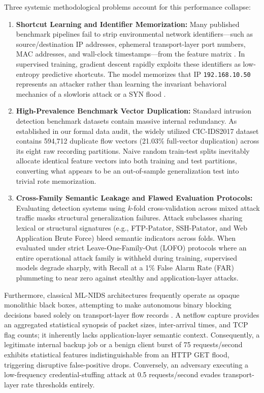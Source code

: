\documentclass[conference]{IEEEtran}
\begin{document}
Three systemic methodological problems account for this performance collapse:
\begin{enumerate}
    \item \textbf{Shortcut Learning and Identifier Memorization:} Many published benchmark pipelines fail to strip environmental network identifiers---such as source/destination IP addresses, ephemeral transport-layer port numbers, MAC addresses, and wall-clock timestamps---from the feature matrix \cite{arp2022dos}. In supervised training, gradient descent rapidly exploits these identifiers as low-entropy predictive shortcuts. The model memorizes that IP \texttt{192.168.10.50} represents an attacker rather than learning the invariant behavioral mechanics of a slowloris attack or a SYN flood \cite{geirhos2020shortcut}.
    \item \textbf{High-Prevalence Benchmark Vector Duplication:} Standard intrusion detection benchmark datasets contain massive internal redundancy. As established in our formal data audit, the widely utilized CIC-IDS2017 dataset contains 594,712 duplicate flow vectors (21.03\% full-vector duplication) across its eight raw recording partitions. Naive random train-test splits inevitably allocate identical feature vectors into both training and test partitions, converting what appears to be an out-of-sample generalization test into trivial rote memorization.
    \item \textbf{Cross-Family Semantic Leakage and Flawed Evaluation Protocols:} Evaluating detection systems using $k$-fold cross-validation across mixed attack traffic masks structural generalization failures. Attack subclasses sharing lexical or structural signatures (e.g., FTP-Patator, SSH-Patator, and Web Application Brute Force) bleed semantic indicators across folds. When evaluated under strict Leave-One-Family-Out (LOFO) protocols where an entire operational attack family is withheld during training, supervised models degrade sharply, with Recall at a 1\% False Alarm Rate (FAR) plummeting to near zero against stealthy and application-layer attacks.
\end{enumerate}

Furthermore, classical ML-NIDS architectures frequently operate as opaque monolithic black boxes, attempting to make autonomous binary blocking decisions based solely on transport-layer flow records \cite{roesch1999snort}. A netflow capture provides an aggregated statistical synopsis of packet sizes, inter-arrival times, and TCP flag counts; it inherently lacks application-layer semantic context. Consequently, a legitimate internal backup job or a benign client burst of 75 requests/second exhibits statistical features indistinguishable from an HTTP GET flood, triggering disruptive false-positive drops. Conversely, an adversary executing a low-frequency credential-stuffing attack at 0.5 requests/second evades transport-layer rate thresholds entirely.
\end{document}
